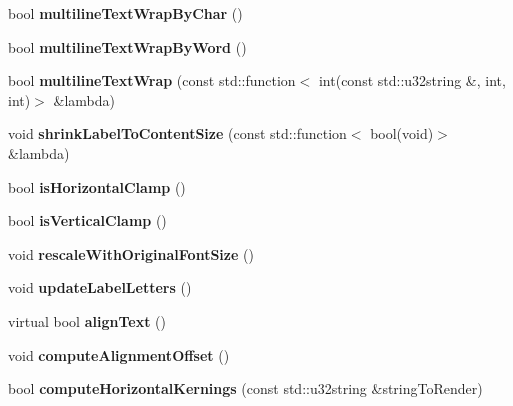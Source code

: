 \begin{DoxyCompactItemize}
\mbox{\label{classLabel_ae64e6940255c20823d7ea693ef0642a5}} 
bool {\bfseries multiline\+Text\+Wrap\+By\+Char} ()
\item 
\mbox{\label{classLabel_a1b74f22307fb323571b8d18f504f8bf6}} 
bool {\bfseries multiline\+Text\+Wrap\+By\+Word} ()
\item 
\mbox{\label{classLabel_aeaf8943c4f7bdd5b91fce2a6a20f5479}} 
bool {\bfseries multiline\+Text\+Wrap} (const std\+::function$<$ int(const std\+::u32string \&, int, int)$>$ \&lambda)
\item 
\mbox{\label{classLabel_aac6fdbe568c6231f7d3dfbc177aa15f2}} 
void {\bfseries shrink\+Label\+To\+Content\+Size} (const std\+::function$<$ bool(void)$>$ \&lambda)
\item 
\mbox{\label{classLabel_a70cebb4ec38fe9ea16124c42ec8fb33f}} 
bool {\bfseries is\+Horizontal\+Clamp} ()
\item 
\mbox{\label{classLabel_ae5da5e8feecd5920580110839b2bced8}} 
bool {\bfseries is\+Vertical\+Clamp} ()
\item 
\mbox{\label{classLabel_a0b96108b1acb82b4f007aacf7ef47f14}} 
void {\bfseries rescale\+With\+Original\+Font\+Size} ()
\item 
\mbox{\label{classLabel_a4c2270ce1600549530adcfa58f861352}} 
void {\bfseries update\+Label\+Letters} ()
\item 
\mbox{\label{classLabel_ad20a787789c381c5b4583d9fc57506e9}} 
virtual bool {\bfseries align\+Text} ()
\item 
\mbox{\label{classLabel_ac7103a8c0ee28155d2d4fd6295180c3b}} 
void {\bfseries compute\+Alignment\+Offset} ()
\item 
\mbox{\label{classLabel_a100914243ba7d1660861e5c8684a84e2}} 
bool {\bfseries compute\+Horizontal\+Kernings} (const std\+::u32string \&string\+To\+Render)
\item 
\mbox{\label{classLabel_a553291a1d2ee28ebd0bf76fcb704946b}} 

\end{DoxyCompactItemize}
